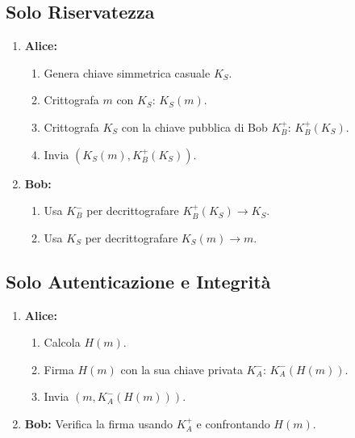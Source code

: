 \subsection{Solo Riservatezza}
\begin{enumerate}
    \item \textbf{Alice:}
    \begin{enumerate}
        \item Genera chiave simmetrica casuale $K_S$.
        \item Crittografa $m$ con $K_S$: $K_S(m)$.
        \item Crittografa $K_S$ con la chiave pubblica di Bob $K_B^+$: $K_B^+(K_S)$.
        \item Invia $(K_S(m), K_B^+(K_S))$.
    \end{enumerate}
    \item \textbf{Bob:}
    \begin{enumerate}
        \item Usa $K_B^-$ per decrittografare $K_B^+(K_S) \rightarrow K_S$.
        \item Usa $K_S$ per decrittografare $K_S(m) \rightarrow m$.
    \end{enumerate}
\end{enumerate}

\subsection{Solo Autenticazione e Integrità}
\begin{enumerate}
    \item \textbf{Alice:}
    \begin{enumerate}
        \item Calcola $H(m)$.
        \item Firma $H(m)$ con la sua chiave privata $K_A^-$: $K_A^-(H(m))$.
        \item Invia $(m, K_A^-(H(m)))$.
    \end{enumerate}
    \item \textbf{Bob:}
    Verifica la firma usando $K_A^+$ e confrontando $H(m)$.
\end{enumerate}

